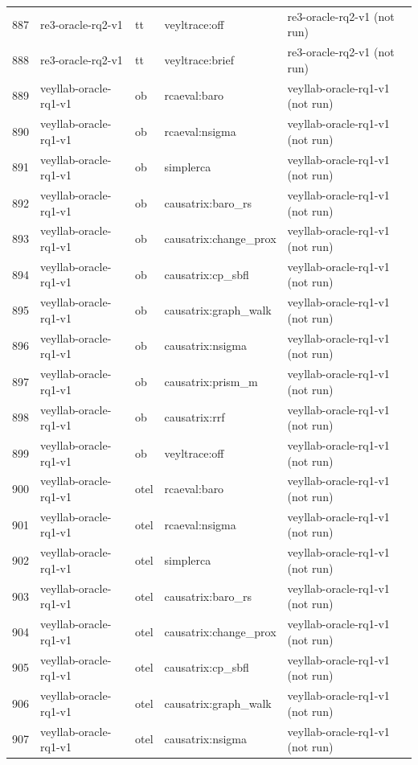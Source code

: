\begin{longtable}{@{}r>{\raggedright\arraybackslash}p{87.0pt}>{\raggedright\arraybackslash}p{18.0pt}>{\raggedright\arraybackslash}p{63.0pt}>{\raggedright\arraybackslash}p{108.0pt}@{}}
887 & re3-oracle-rq2-v1 & tt & veyltrace:off & re3-oracle-rq2-v1 (not run) \\
888 & re3-oracle-rq2-v1 & tt & veyltrace:brief & re3-oracle-rq2-v1 (not run) \\
889 & veyllab-oracle-rq1-v1 & ob & rcaeval:baro & veyllab-oracle-rq1-v1 (not run) \\
890 & veyllab-oracle-rq1-v1 & ob & rcaeval:nsigma & veyllab-oracle-rq1-v1 (not run) \\
891 & veyllab-oracle-rq1-v1 & ob & simplerca & veyllab-oracle-rq1-v1 (not run) \\
892 & veyllab-oracle-rq1-v1 & ob & causatrix:baro\_rs & veyllab-oracle-rq1-v1 (not run) \\
893 & veyllab-oracle-rq1-v1 & ob & causatrix:change\_prox & veyllab-oracle-rq1-v1 (not run) \\
894 & veyllab-oracle-rq1-v1 & ob & causatrix:cp\_sbfl & veyllab-oracle-rq1-v1 (not run) \\
895 & veyllab-oracle-rq1-v1 & ob & causatrix:graph\_walk & veyllab-oracle-rq1-v1 (not run) \\
896 & veyllab-oracle-rq1-v1 & ob & causatrix:nsigma & veyllab-oracle-rq1-v1 (not run) \\
897 & veyllab-oracle-rq1-v1 & ob & causatrix:prism\_m & veyllab-oracle-rq1-v1 (not run) \\
898 & veyllab-oracle-rq1-v1 & ob & causatrix:rrf & veyllab-oracle-rq1-v1 (not run) \\
899 & veyllab-oracle-rq1-v1 & ob & veyltrace:off & veyllab-oracle-rq1-v1 (not run) \\
900 & veyllab-oracle-rq1-v1 & otel & rcaeval:baro & veyllab-oracle-rq1-v1 (not run) \\
901 & veyllab-oracle-rq1-v1 & otel & rcaeval:nsigma & veyllab-oracle-rq1-v1 (not run) \\
902 & veyllab-oracle-rq1-v1 & otel & simplerca & veyllab-oracle-rq1-v1 (not run) \\
903 & veyllab-oracle-rq1-v1 & otel & causatrix:baro\_rs & veyllab-oracle-rq1-v1 (not run) \\
904 & veyllab-oracle-rq1-v1 & otel & causatrix:change\_prox & veyllab-oracle-rq1-v1 (not run) \\
905 & veyllab-oracle-rq1-v1 & otel & causatrix:cp\_sbfl & veyllab-oracle-rq1-v1 (not run) \\
906 & veyllab-oracle-rq1-v1 & otel & causatrix:graph\_walk & veyllab-oracle-rq1-v1 (not run) \\
907 & veyllab-oracle-rq1-v1 & otel & causatrix:nsigma & veyllab-oracle-rq1-v1 (not run) \\

\end{longtable}
